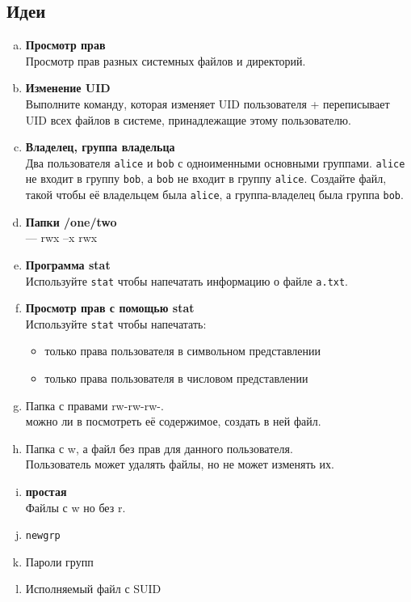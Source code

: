 \documentclass{article}
\begin{document}
\subsection*{Идеи}
\begin{enumerate}[a.]

\item \textbf{Просмотр прав}\\
Просмотр прав разных системных файлов и директорий.



\item \textbf{Изменение UID}\\
Выполните команду, которая изменяет UID пользователя + переписывает UID всех файлов в системе, принадлежащие этому пользователю. 

\item \textbf{Владелец, группа владельца}\\
Два пользователя \texttt{alice} и \texttt{bob} с одноименными основными группами. \texttt{alice} не входит в группу \texttt{bob}, а \texttt{bob} не входит в группу \texttt{alice}. Создайте файл, такой чтобы её владельцем была \texttt{alice}, а группа-владелец была группа \texttt{bob}.

\item \textbf{Папки /one/two}\\
--- rwx
--x rwx

\item \textbf{Программа stat}\\
Используйте \texttt{stat} чтобы напечатать информацию о файле \texttt{a.txt}.

\item \textbf{Просмотр прав с помощью stat}\\
Используйте \texttt{stat} чтобы напечатать: 
\begin{itemize}
\item только права пользователя в символьном представлении
\item только права пользователя в числовом представлении
\end{itemize}

\item Папка с правами rw-rw-rw-.\\
можно ли в посмотреть её содержимое, создать в ней файл.


\item Папка с w, а файл без прав для данного пользователя.\\
Пользователь может удалять файлы, но не может изменять их.


\item \textbf{простая}\\
Файлы с w но без r.


\item \texttt{newgrp}\\

\item Пароли групп\\

\item Исполняемый файл с SUID\\

\end{enumerate}
\fi
\end{document}
